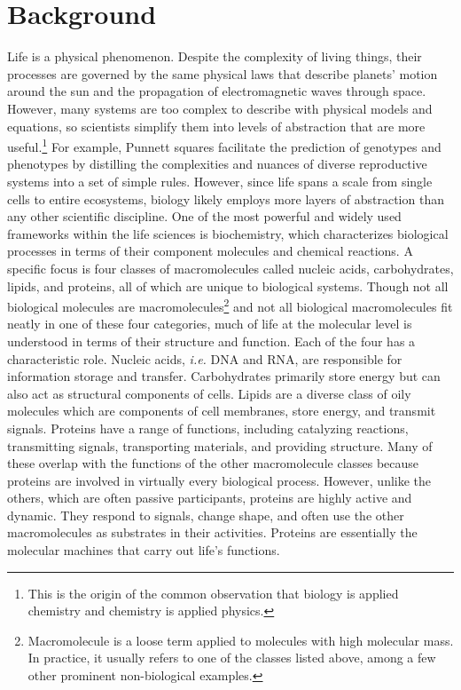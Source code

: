 \section{Background}
Life is a physical phenomenon. Despite the complexity of living things, their processes are governed by the same physical laws that describe planets' motion around the sun and the propagation of electromagnetic waves through space. However, many systems are too complex to describe with physical models and equations, so scientists simplify them into levels of abstraction that are more useful.\footnote{This is the origin of the common observation that biology is applied chemistry and chemistry is applied physics.} For example, Punnett squares facilitate the prediction of genotypes and phenotypes by distilling the complexities and nuances of diverse reproductive systems into a set of simple rules. However, since life spans a scale from single cells to entire ecosystems, biology likely employs more layers of abstraction than any other scientific discipline. One of the most powerful and widely used frameworks within the life sciences is biochemistry, which characterizes biological processes in terms of their component molecules and chemical reactions. A specific focus is four classes of macromolecules called nucleic acids, carbohydrates, lipids, and proteins, all of which are unique to biological systems. Though not all biological molecules are macromolecules\footnote{Macromolecule is a loose term applied to molecules with high molecular mass. In practice, it usually refers to one of the classes listed above, among a few other prominent non-biological examples.} and not all biological macromolecules fit neatly in one of these four categories, much of life at the molecular level is understood in terms of their structure and function. Each of the four has a characteristic role. Nucleic acids, \textit{i.e.} DNA and RNA, are responsible for information storage and transfer. Carbohydrates primarily store energy but can also act as structural components of cells. Lipids are a diverse class of oily molecules which are components of cell membranes, store energy, and transmit signals. Proteins have a range of functions, including catalyzing reactions, transmitting signals, transporting materials, and providing structure. Many of these overlap with the functions of the other macromolecule classes because proteins are involved in virtually every biological process. However, unlike the others, which are often passive participants, proteins are highly active and dynamic. They respond to signals, change shape, and often use the other macromolecules as substrates in their activities. Proteins are essentially the molecular machines that carry out life's functions.

